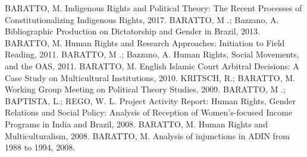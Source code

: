 
\begin{cvcitems}
  \cvcitem
      {BARATTO, M.}
      {Indigenous Rights and Political Theory: The Recent Processes of Constitutionalizing Indigenous Rights, 2017.}
  \cvcitem
      {BARATTO, M .; Bazzano, A.}
      {Bibliographic Production on Dictatorship and Gender in Brazil, 2013.}
  \cvcitem
      {BARATTO, M.}
      {Human Rights and Research Approaches: Initiation to Field Reading, 2011.}
  \cvcitem
      {BARATTO, M .; Bazzano, A.}
      {Human Rights, Social Movements, and the OAS, 2011.}
  \cvcitem
      {BARATTO, M.}
      {English Islamic Court Arbitral Decisions: A Case Study on Multicultural Institutions, 2010.}
  \cvcitem
      {KRITSCH, R.; BARATTO, M.}
      {Working Group Meeting on Political Theory Studies, 2009.}
  \cvcitem
      {BARATTO, M .; BAPTISTA, L.; REGO, W. L.}
      {Project Activity Report: Human Rights, Gender Relations and Social Policy: Analysis of Reception of Women's-focused Income Programs in India and Brazil, 2008.}
  \cvcitem
      {BARATTO, M.}
      {Human Rights and Multiculturalism, 2008.}
  \cvcitem
      {BARATTO, M.}
      {Analysis of injunctions in ADIN from 1988 to 1994, 2008.}
\end{cvcitems}

%
